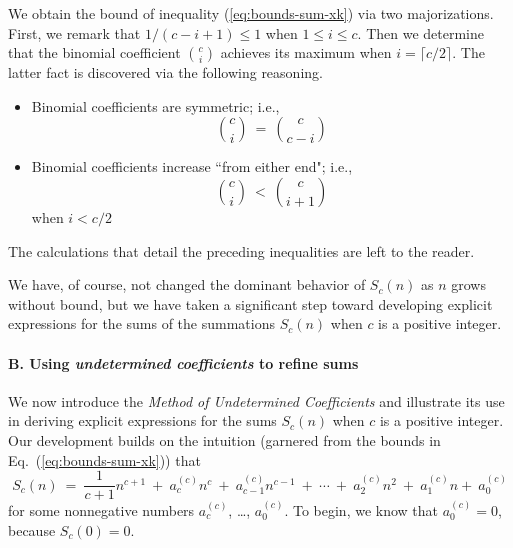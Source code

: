 \smallskip


We obtain the bound of inequality (\ref{eq:bounds-sum-xk}) via two majorizations.  First, we remark that $1/(c-i+1) \leq 1$ when $1 \leq i \leq c$.  Then we determine that the binomial coefficient $\displaystyle {c \choose i}$ achieves its maximum when $i =  \lceil c/2 \rceil$.  The latter fact is discovered via the following reasoning.
\begin{itemize}
\item
Binomial coefficients are symmetric; i.e.,
\[ {c \choose i} \ = \ {c \choose c-i} \]
\medskip\item
Binomial coefficients increase ``from either end"; i.e.,
\[ {c \choose i} \ < \ {c \choose i+1} \]
when $i < c/2$
\end{itemize}
The calculations that detail the preceding inequalities are left to the reader.


\smallskip

We have, of course, not changed the dominant behavior of $S_c(n)$ as $n$ grows without bound, but we have taken a significant step toward developing explicit expressions for the sums of the summations $S_c(n)$ when $c$ is a positive integer.

\paragraph{B. Using {\em undetermined coefficients} to refine sums}

We now introduce the {\em Method of Undetermined Coefficients} and
illustrate its use in deriving explicit expressions for the sums
$S_c(n)$ when $c$ is a positive integer.  Our development builds on
the intuition (garnered from the bounds in Eq.~(\ref{eq:bounds-sum-xk})) that
\[ S_c(n) \ = \ \frac{1}{c+1} n^{c+1} \ + \ a^{(c)}_c n^c \ + \
a^{(c)}_{c-1} n^{c-1} \ + \ \cdots \ + \ a^{(c)}_2 n^2 \ + \ a^{(c)}_1 n
 + \ a^{(c)}_0
\]
for some nonnegative numbers $a^{(c)}_c$, \ldots, $a^{(c)}_0$.  To begin, we know that $a^{(c)}_0 = 0$, because $S_c(0) = 0$.

\bigskip

\noindent {}
\bigskip

